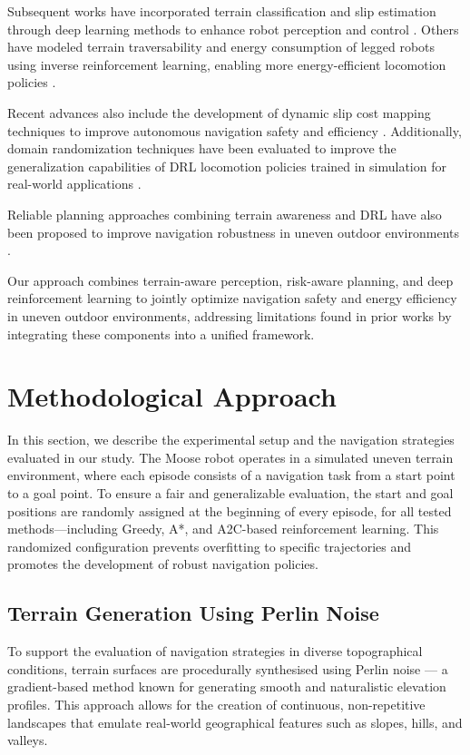 \documentclass[11pt,twocolumn]{article}
\begin{document}
Subsequent works have incorporated terrain classification and slip estimation through deep learning methods to enhance robot perception and control \cite{gonzalez2018deepterramechanics}. Others have modeled terrain traversability and energy consumption of legged robots using inverse reinforcement learning, enabling more energy-efficient locomotion policies \cite{gan2022energy}.

Recent advances also include the development of dynamic slip cost mapping techniques to improve autonomous navigation safety and efficiency \cite{slipnet2024}. Additionally, domain randomization techniques have been evaluated to improve the generalization capabilities of DRL locomotion policies trained in simulation for real-world applications \cite{mdpi2022randomization}.

Reliable planning approaches combining terrain awareness and DRL have also been proposed to improve navigation robustness in uneven outdoor environments \cite{weerakoon2022terp}.

Our approach combines terrain-aware perception, risk-aware planning, and deep reinforcement learning to jointly optimize navigation safety and energy efficiency in uneven outdoor environments, addressing limitations found in prior works by integrating these components into a unified framework.


\section{Methodological Approach}
In this section, we describe the experimental setup and the navigation strategies evaluated in our study. The Moose robot operates in a simulated uneven terrain environment, where each episode consists of a navigation task from a start point to a goal point. To ensure a fair and generalizable evaluation, the start and goal positions are randomly assigned at the beginning of every episode, for all tested methods—including Greedy, A*, and A2C-based reinforcement learning. This randomized configuration prevents overfitting to specific trajectories and promotes the development of robust navigation policies.

\subsection{Terrain Generation Using Perlin Noise}

To support the evaluation of navigation strategies in diverse topographical conditions, terrain surfaces are procedurally synthesised using Perlin noise — a gradient-based method known for generating smooth and naturalistic elevation profiles. This approach allows for the creation of continuous, non-repetitive landscapes that emulate real-world geographical features such as slopes, hills, and valleys.
\end{document}

